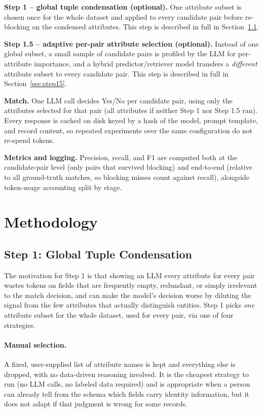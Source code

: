 \documentclass[11pt]{article}
\begin{document}
\textbf{Step 1 -- global tuple condensation (optional).} One attribute subset is
chosen once for the whole dataset and applied to every candidate pair before
re-blocking on the condensed attributes. This step is described in full in
Section~\ref{sec:step1}.

\textbf{Step 1.5 -- adaptive per-pair attribute selection (optional).} Instead of one
global subset, a small sample of candidate pairs is profiled by the LLM for
per-attribute importance, and a hybrid predictor/retriever model transfers a
\emph{different} attribute subset to every candidate pair. This step is described in
full in Section~\ref{sec:step15}.

\textbf{Match.} One LLM call decides Yes/No per candidate pair, using only the
attributes selected for that pair (all attributes if neither Step 1 nor Step 1.5
ran). Every response is cached on disk keyed by a hash of the model, prompt
template, and record content, so repeated experiments over the same configuration
do not re-spend tokens.

\textbf{Metrics and logging.} Precision, recall, and F1 are computed both at the
candidate-pair level (only pairs that survived blocking) and end-to-end (relative to
all ground-truth matches, so blocking misses count against recall), alongside
token-usage accounting split by stage.

\section{Methodology}
\label{sec:methodology}

\subsection{Step 1: Global Tuple Condensation}
\label{sec:step1}

The motivation for Step 1 is that showing an LLM every attribute for every pair
wastes tokens on fields that are frequently empty, redundant, or simply irrelevant
to the match decision, and can make the model's decision worse by diluting the
signal from the few attributes that actually distinguish entities. Step 1 picks
\emph{one} attribute subset for the whole dataset, used for every pair, via one of
four strategies.

\paragraph{Manual selection.} A fixed, user-supplied list of attribute names is kept
and everything else is dropped, with no data-driven reasoning involved. It is the
cheapest strategy to run (no LLM calls, no labeled data required) and is appropriate
when a person can already tell from the schema which fields carry identity
information, but it does not adapt if that judgment is wrong for some records.
\end{document}
